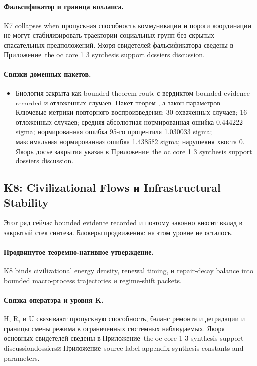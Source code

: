 \paragraph{Фальсификатор и граница коллапса.}
K7 collapses when пропускная способность коммуникации и пороги координации не могут стабилизировать траектории социальных групп без скрытых спасательных предположений.
Якоря свидетелей фальсификатора сведены в Приложение~the oc core 1 3 synthesis support dossiers discussion.

\paragraph{Связки доменных пакетов.}
\begin{itemize}[leftmargin=1.6em,nosep]
\item Биология закрыта как bounded theorem route с вердиктом bounded evidence recorded и  отложенных случаев. Пакет теорем , а закон параметров . Ключевые метрики повторного воспроизведения: 30 охваченных случаев; 16 отложенных случаев; средняя абсолютная нормированная ошибка 0.444222 sigma; нормированная ошибка 95-го процентиля 1.030033 sigma; максимальная нормированная ошибка 1.438582 sigma; нарушения хвоста 0. Якорь досье закрытия указан в Приложение~the oc core 1 3 synthesis support dossiers discussion.
\end{itemize}

\subsection{K8: Civilizational Flows и Infrastructural Stability}
\label{sec:oc-core-1-3-synthesis-k8}
Этот ряд сейчас bounded evidence recorded и поэтому законно вносит вклад в закрытый стек синтеза.
Блокеры продвижения: на этом уровне не осталось.

\paragraph{Продвинутое теоремно-нативное утверждение.}
K8 binds civilizational energy density, renewal timing, и repair-decay balance into bounded macro-process trajectories и regime-shift packets.

\paragraph{Связка оператора и уровня K.}
H, R, и U связывают пропускную способность, баланс ремонта и деградации и границы смены режима в ограниченных системных наблюдаемых.
Якоря основных свидетелей сведены в Приложение~the oc core 1 3 synthesis support discussiondossiersи Приложение~source label appendix synthesis constants and parameters.


